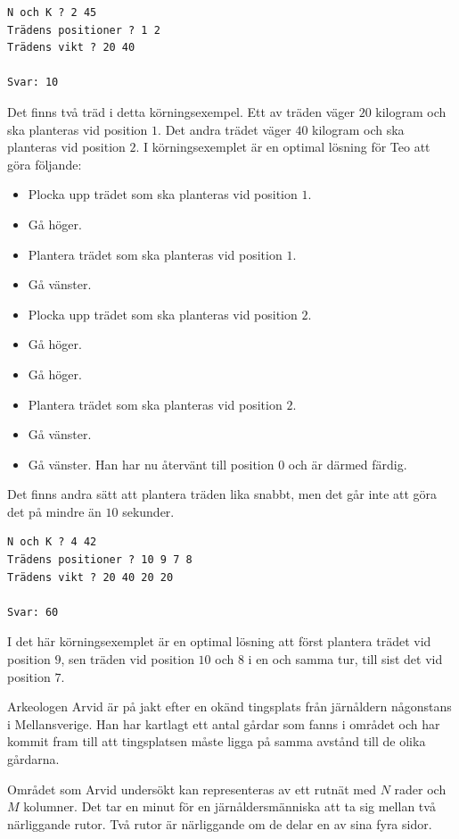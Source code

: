 \begin{verbatim}
N och K ? 2 45
Trädens positioner ? 1 2
Trädens vikt ? 20 40

Svar: 10
\end{verbatim}
 Det finns två träd i detta körningsexempel.
Ett av träden väger $20$ kilogram och ska planteras vid position $1$. Det andra trädet väger $40$ kilogram och ska planteras vid position $2$.
I körningsexemplet är en optimal lösning för Teo att göra följande:
\begin{itemize}
  \item Plocka upp trädet som ska planteras vid position $1$.
  \item Gå höger.
  \item Plantera trädet som ska planteras vid position $1$.
  \item Gå vänster.
  \item Plocka upp trädet som ska planteras vid position $2$.
  \item Gå höger.
  \item Gå höger.
  \item Plantera trädet som ska planteras vid position $2$.
  \item Gå vänster.
  \item Gå vänster. Han har nu återvänt till position $0$ och är därmed färdig.
\end{itemize}
Det finns andra sätt att plantera träden lika snabbt, men det går inte att göra det på
mindre än $10$ sekunder.


\vspace{0.5cm}
\begin{verbatim}
N och K ? 4 42
Trädens positioner ? 10 9 7 8
Trädens vikt ? 20 40 20 20

Svar: 60
\end{verbatim}
 I det här körningsexemplet är en optimal lösning att först plantera trädet vid position $9$, sen träden vid position $10$ och $8$ i en och samma tur, till sist det vid position $7$.


\newpage
{}

Arkeologen Arvid är på jakt efter en okänd tingsplats från järnåldern någonstans i Mellansverige. Han har kartlagt
ett antal gårdar som fanns i området och har kommit fram till att tingsplatsen måste ligga på samma avstånd
till de olika gårdarna.

Området som Arvid undersökt kan representeras av ett rutnät med $N$ rader och $M$ kolumner. Det tar en minut för en
järnåldersmänniska att ta sig mellan två närliggande rutor. Två rutor är närliggande om de delar en av sina fyra sidor.

